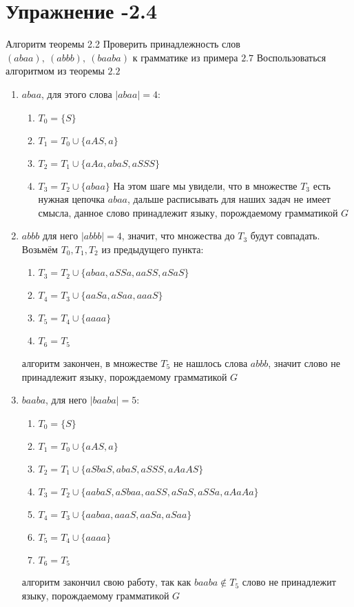 \documentclass[12pt, a4paper, oneside]{memoir}
\begin{document}
\section*{Упражнение -2.4}
\begin{solution}
    {Алгоритм теоремы 2.2}
    {Проверить принадлежность слов $(abaa),\ (abbb),\ (baaba) $ к грамматике из примера $2.7$}
    {Воспользоваться алгоритмом из теоремы $2.2$}
    \begin{enumerate}
        \item $abaa$, для этого слова $|abaa| = 4$:
              \begin{enumerate}
                  \item $T_0 = \{S\}$
                  \item $T_1 = T_0 \cup \{aAS, a\}$
                  \item $T_2 = T_1 \cup \{aAa, abaS, aSSS\}$
                  \item $T_3 = T_2 \cup \{abaa\}$ На этом шаге мы увидели, что в множестве $T_3$ есть нужная цепочка $abaa$, дальше расписывать для наших задач не имеет смысла, данное слово принадлежит языку, порождаемому грамматикой $G$
              \end{enumerate}
        \item $abbb$ для него $|abbb| = 4$, значит, что множества до $T_3$ будут совпадать. Возьмём $T_0, T_1, T_2$ из предыдущего пункта:
              \begin{enumerate}
                  \item $T_3 = T_2 \cup \{abaa, aSSa, aaSS, aSaS\}$
                  \item $T_4 = T_3 \cup\{aaSa, aSaa, aaaS\}$
                  \item $T_5 = T_4 \cup \{aaaa\}$
                  \item $T_6 = T_5$
              \end{enumerate}
              алгоритм закончен, в множестве $T_5$ не нашлось слова $abbb$, значит слово не принадлежит языку, порождаемому грамматикой $G$
        \item $baaba$, для него $|baaba| = 5$:
              \begin{enumerate}
                  \item $T_0 = \{S\}$
                  \item $T_1 = T_0 \cup \{aAS, a\}$
                  \item $T_2 = T_1 \cup \{aSbaS, abaS, aSSS, aAaAS\}$
                  \item $T_3 = T_2 \cup \{aabaS, aSbaa, aaSS, aSaS, aSSa, aAaAa\}$
                  \item $T_4 = T_3 \cup \{aabaa, aaaS, aaSa, aSaa\}$
                  \item $T_5 = T_4 \cup \{aaaa\}$
                  \item $T_6 = T_5$
              \end{enumerate}
              алгоритм закончил свою работу, так как $baaba \notin T_5$ слово не принадлежит языку, порождаемому грамматикой $G$
    \end{enumerate}

\end{solution}
\end{document}
